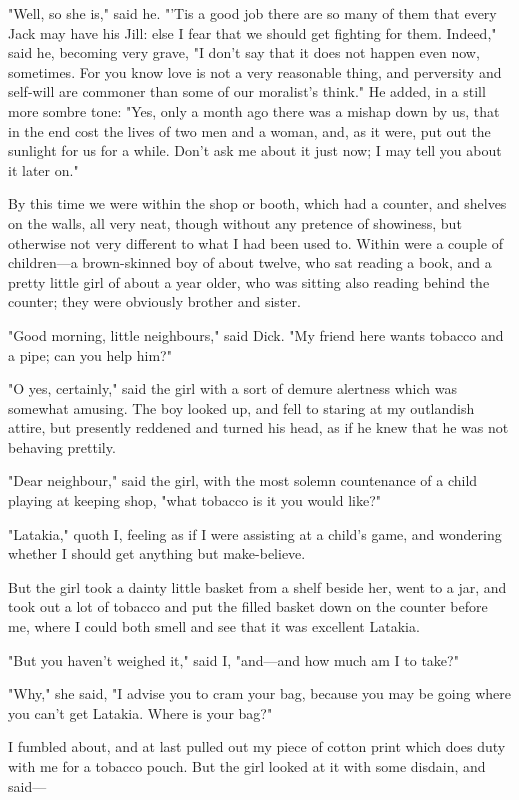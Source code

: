 "Well, so she is," said he. "'Tis a good job there are so many of them
that every Jack may have his Jill: else I fear that we should get
fighting for them. Indeed," said he, becoming very grave, "I don't say
that it does not happen even now, sometimes. For you know love is not a
very reasonable thing, and perversity and self-will are commoner than
some of our moralist's think." He added, in a still more sombre tone:
"Yes, only a month ago there was a mishap down by us, that in the end
cost the lives of two men and a woman, and, as it were, put out the
sunlight for us for a while. Don't ask me about it just now; I may tell
you about it later on."

By this time we were within the shop or booth, which had a counter, and
shelves on the walls, all very neat, though without any pretence of
showiness, but otherwise not very different to what I had been used to.
Within were a couple of children---a brown-skinned boy of about twelve,
who sat reading a book, and a pretty little girl of about a year older,
who was sitting also reading behind the counter; they were obviously
brother and sister.

"Good morning, little neighbours," said Dick. "My friend here wants
tobacco and a pipe; can you help him?"

"O yes, certainly," said the girl with a sort of demure alertness which
was somewhat amusing. The boy looked up, and fell to staring at my
outlandish attire, but presently reddened and turned his head, as if he
knew that he was not behaving prettily.

"Dear neighbour," said the girl, with the most solemn countenance of a
child playing at keeping shop, "what tobacco is it you would like?"

"Latakia," quoth I, feeling as if I were assisting at a child's game,
and wondering whether I should get anything but make-believe.

But the girl took a dainty little basket from a shelf beside her, went
to a jar, and took out a lot of tobacco and put the filled basket down
on the counter before me, where I could both smell and see that it was
excellent Latakia.

"But you haven't weighed it," said I, "and---and how much am I to take?"

"Why," she said, "I advise you to cram your bag, because you may be
going where you can't get Latakia. Where is your bag?"

I fumbled about, and at last pulled out my piece of cotton print which
does duty with me for a tobacco pouch. But the girl looked at it with
some disdain, and said---

